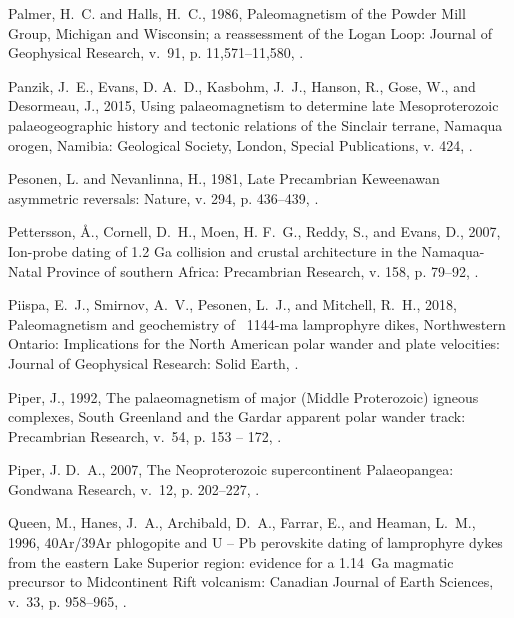 \documentclass[11pt,letterpaper]{article}
\begin{document}
\begin{thebibliography}{153}
Palmer, H.~C. and Halls, H.~C., 1986, Paleomagnetism of the {P}owder {M}ill
  {G}roup, {M}ichigan and {W}isconsin; a reassessment of the {L}ogan {L}oop:
  Journal of Geophysical Research, v.~91, p. 11,571--11,580,
  .

Panzik, J.~E., Evans, D. A.~D., Kasbohm, J.~J., Hanson, R., Gose, W., and
  Desormeau, J., 2015, {Using palaeomagnetism to determine late Mesoproterozoic
  palaeogeographic history and tectonic relations of the Sinclair terrane,
  Namaqua orogen, Namibia}: Geological Society, London, Special Publications,
  v. 424, .

Pesonen, L. and Nevanlinna, H., 1981, Late {P}recambrian {K}eweenawan
  asymmetric reversals: Nature, v. 294, p. 436--439, .

Pettersson, {\AA}., Cornell, D.~H., Moen, H. F.~G., Reddy, S., and Evans, D.,
  2007, {Ion-probe dating of 1.2 Ga collision and crustal architecture in the
  Namaqua-Natal Province of southern Africa}: Precambrian Research, v. 158, p.
  79--92, .

Piispa, E.~J., Smirnov, A.~V., Pesonen, L.~J., and Mitchell, R.~H., 2018,
  Paleomagnetism and geochemistry of ~1144-ma lamprophyre dikes, {N}orthwestern
  {O}ntario: Implications for the {N}orth {A}merican polar wander and plate
  velocities: Journal of Geophysical Research: Solid Earth,
  .

Piper, J., 1992, {The palaeomagnetism of major (Middle Proterozoic) igneous
  complexes, South Greenland and the Gardar apparent polar wander track}:
  Precambrian Research, v.~54, p. 153 -- 172,
  .

Piper, J. D.~A., 2007, The {N}eoproterozoic supercontinent {P}alaeopangea:
  Gondwana Research, v.~12, p. 202--227, .

Queen, M., Hanes, J.~A., Archibald, D.~A., Farrar, E., and Heaman, L.~M., 1996,
  {40Ar/39Ar phlogopite and U -- Pb perovskite dating of lamprophyre dykes from
  the eastern Lake Superior region: evidence for a 1.14 Ga magmatic precursor
  to Midcontinent Rift volcanism}: Canadian Journal of Earth Sciences, v.~33,
  p. 958--965, .


\end{thebibliography}
\end{document}
